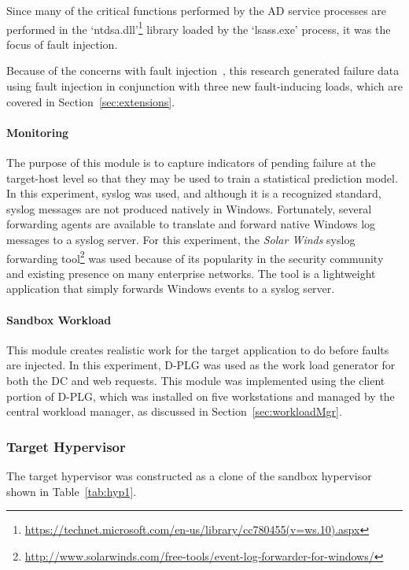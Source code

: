 \tabWSWFITFaults

Since many of the critical functions performed by the \ac{AD} service processes
are performed in the
`ntdsa.dll'\footnote{\url{https://technet.microsoft.com/en-us/library/cc780455(v=ws.10).aspx}}
library loaded by the `lsass.exe' process, it was the focus of fault injection.

Because of the concerns with fault
injection~\citep{cotroneo2012,kikuchi2014,natella2010,natella2016assessing},
this research generated failure data using fault injection in conjunction with
three new fault-inducing loads, which are covered in
Section~\ref{sec:extensions}.

\paragraph{Monitoring} \label{sec:sandboxMonitoringTool} 
The purpose of this module is to capture indicators of pending failure at the
target-host level so that they may be used to train a statistical prediction
model.  In this experiment, syslog was used, and although it is a recognized
standard, syslog messages are not produced natively in Windows.  Fortunately,
several forwarding agents are available to translate and forward native Windows
log messages to a syslog server.  For this experiment, the \emph{Solar Winds}
syslog forwarding
tool\footnote{\url{http://www.solarwinds.com/free-tools/event-log-forwarder-for-windows/}}
was used because of its popularity in the security community and existing
presence on many enterprise networks.  The tool is a lightweight application
that simply forwards Windows events to a syslog server.

\paragraph{Sandbox Workload}  \label{sec:sandboxWorkload} 
This module creates realistic work for the target application to do before
faults are injected.  In this experiment, \ac{D-PLG} was used as the work load
generator for both the \ac{DC} and web requests.  This module was implemented
using the client portion of \ac{D-PLG}, which was installed on five
workstations and managed by the central workload manager, as discussed in
Section~\ref{sec:workloadMgr}.

\subsubsection{Target Hypervisor} \label{sec:target}
The target hypervisor was constructed as a clone of the sandbox hypervisor
shown in Table~\ref{tab:hyp1}. 


